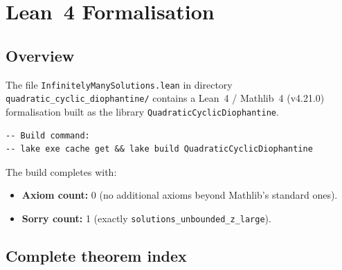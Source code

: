 \documentclass[12pt,a4paper]{article}
\theoremstyle{definition}
\begin{document}
\section{Lean~4 Formalisation}\label{sec:lean}

\subsection{Overview}

The file \texttt{InfinitelyManySolutions.lean} in directory
\texttt{quadratic\_cyclic\_diophantine/} contains a Lean~4 / Mathlib~4
(v4.21.0) formalisation built as the library
\texttt{QuadraticCyclicDiophantine}.

\begin{lstlisting}[language=Lean4]
-- Build command:
-- lake exe cache get && lake build QuadraticCyclicDiophantine
\end{lstlisting}

The build completes with:
\begin{itemize}[noitemsep]
  \item \textbf{Axiom count:} 0 (no additional axioms beyond Mathlib's standard ones).
  \item \textbf{Sorry count:} 1 (exactly \texttt{solutions\_unbounded\_z\_large}).
\end{itemize}

\subsection{Complete theorem index}
\end{document}
